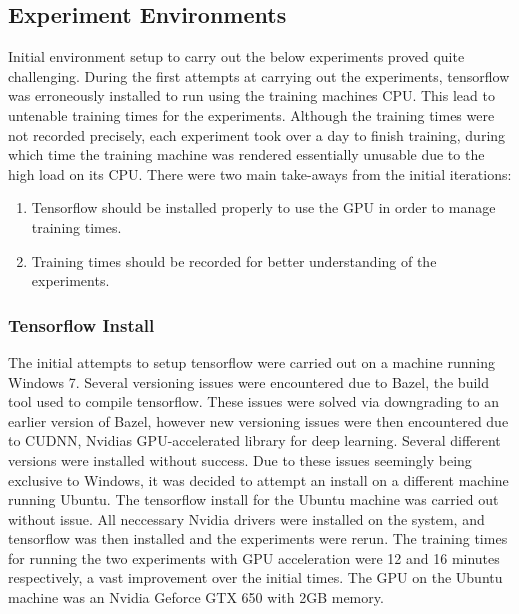 \documentclass[12pt]{report}
\begin{document}
\subsection{Experiment Environments}
\begin{flushleft}
Initial environment setup to carry out the below experiments proved quite challenging. During the first attempts at carrying out the experiments, tensorflow was erroneously installed to run using the training machines CPU. This lead to untenable training times for the experiments. Although the training times were not recorded precisely, each experiment took over a day to finish training, during which time the training machine was rendered essentially unusable due to the high load on its CPU. There were two main take-aways from the initial iterations:

\begin{enumerate}
  \item Tensorflow should be installed properly to use the GPU in order to manage training times.
  \item Training times should be recorded for better understanding of the experiments.
\end{enumerate}

\end{flushleft}

\subsubsection{Tensorflow Install}
\begin{flushleft}
The initial attempts to setup tensorflow were carried out on a machine running Windows 7. Several versioning issues were encountered due to Bazel, the build tool used to compile tensorflow. These issues were solved via downgrading to an earlier version of Bazel, however new versioning issues were then encountered due to CUDNN, Nvidias GPU-accelerated library for deep learning. Several different versions were installed without success. Due to these issues seemingly being exclusive to Windows, it was decided to attempt an install on a different machine running Ubuntu. The tensorflow install for the Ubuntu machine was carried out without issue. All neccessary Nvidia drivers were installed on the system, and tensorflow was then installed and the experiments were rerun. The training times for running the two experiments with GPU acceleration were 12 and 16 minutes respectively, a vast improvement over the initial times. The GPU on the Ubuntu machine was an Nvidia Geforce GTX 650 with 2GB memory.
\end{flushleft}
\end{document}
